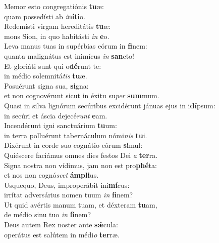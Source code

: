 \evenverse Memor esto congregatiónis \textbf{tu}æ:~\*\\
\evenverse quam possedísti ab \textit{i}\textbf{ní}\textbf{ti}o.\\
\oddverse Redemísti virgam hereditátis \textbf{tu}æ:~\*\\
\oddverse mons Sion, in quo habitásti \textit{in} \textbf{e}o.\\
\evenverse Leva manus tuas in supérbias eórum in \textbf{fi}nem:~\*\\
\evenverse quanta malignátus est inimícus \textit{in} \textbf{san}cto!\\
\oddverse Et gloriáti sunt qui o\textbf{dé}runt te:~\*\\
\oddverse in médio solemnitá\textit{tis} \textbf{tu}æ.\\
\evenverse Posuérunt signa sua, \textbf{si}gna:~\*\\
\evenverse et non cognovérunt sicut in éxitu su\textit{per} \textbf{sum}mum.\\
\oddverse Quasi in silva lignórum secúribus excidérunt jánuas ejus in i\textbf{dí}psum:~\*\\
\oddverse in secúri et áscia dejecé\textit{runt} \textbf{e}am.\\
\evenverse Incendérunt igni sanctuárium \textbf{tu}um:~\*\\
\evenverse in terra polluérunt tabernáculum nómi\textit{nis} \textbf{tu}i.\\
\oddverse Dixérunt in corde suo cognátio eórum \textbf{si}mul:~\*\\
\oddverse Quiéscere faciámus omnes dies festos Dei \textit{a} \textbf{ter}ra.\\
\evenverse Signa nostra non vídimus, jam non est pro\textbf{phé}ta:~\*\\
\evenverse et nos non cognó\textit{scet} \textbf{ám}\textbf{pli}us.\\
\oddverse Usquequo, Deus, improperábit ini\textbf{mí}cus:~\*\\
\oddverse irrítat adversárius nomen tuum \textit{in} \textbf{fi}nem?\\
\evenverse Ut quid avértis manum tuam, et déxteram \textbf{tu}am,~\*\\
\evenverse de médio sinu tuo \textit{in} \textbf{fi}nem?\\
\oddverse Deus autem Rex noster ante \textbf{sǽ}cula:~\*\\
\oddverse operátus est salútem in médi\textit{o} \textbf{ter}ræ.\\
